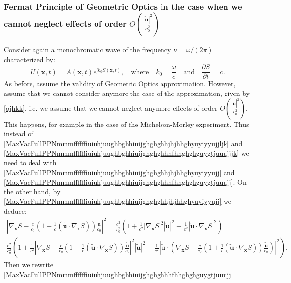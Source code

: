 \documentclass{article}
\theoremstyle{definition}
\theoremstyle{remark}
\renewcommand{\vec}[1]{\mathbf{#1}}
\newcommand{\er}{\eqref}
\newcommand{\er}{\eqref}
\begin{document}
\subsubsection{Fermat Principle of Geometric Optics in the case when we cannot neglect effects of order $O\left(\frac{|\vec {\tilde
u}|^2}{c^2_0}\right)$}
Consider again a monochromatic wave of the
frequency $\nu=\omega/(2\pi)$ characterized by:
\begin{equation}\label{MaxVacFullPPNmmmffffffiuiuhjuughbghhuiiujjhhjjhjhhjyuyhh}
U(\vec x,t)=A(\vec x,t)e^{ik_0S(\vec x,t)},\quad\text{where}\quad
k_0=\frac{\omega}{c}\quad\text{and}\quad\frac{\partial S}{\partial
t}=c\,.
\end{equation}
As before, assume the validity of Geometric Optics approximation.
However, assume that we cannot consider anymore the case of the
approximation, given by \er{ojhkk}, i.e. we assume that we cannot
neglect anymore effects of order $O\left(\frac{|\vec {\tilde
u}|^2}{c^2_0}\right)$. This happens, for example in the case of the
Michelson-Morley experiment. Thus instead of
\er{MaxVacFullPPNmmmffffffiuiuhjuughbghhiuijghghghhjhjhhghyuyiyyujjljk}
and
\er{MaxVacFullPPNmmmffffffiuiuhjuughbghhiuijghghghhhfhhghghguygtjuuujjjk}
we need to deal with
\er{MaxVacFullPPNmmmffffffiuiuhjuughbghhiuijghghghhjhjhhghyuyiyyujj}
 and
\er{MaxVacFullPPNmmmffffffiuiuhjuughbghhiuijghghghhhfhhghghguygtjuuujj}.
On the other hand, by
\er{MaxVacFullPPNmmmffffffiuiuhjuughbghhiuijghghghhjhjhhghyuyiyyujj}
we deduce:
\begin{multline}\label{MaxVacFullPPNmmmffffffiuiuhjuughbghhiuijghghghhjhjhhghyuyiyyujjkhgggghgg}
\left|\nabla_{\vec x}S-\frac{c}{c_0}\left(1+\frac{1}{c}\left(\vec
{\tilde u}\cdot\nabla_{\vec x}S\right)\right)\frac{\vec {\tilde
u}}{c_0}\right|^2=\frac{c^2}{c^2_0}\left(1+\frac{1}{c^2}\left|\nabla_\vec
x S\right|^2\left|\vec {\tilde u}\right|^2-\frac{1}{c^2}\left|\vec
{\tilde u}\cdot\nabla_\vec x S\right|^2\right)=\\
\frac{c^2}{c^2_0}\left(1+\frac{1}{c^2}\left|\nabla_{\vec
x}S-\frac{c}{c_0}\left(1+\frac{1}{c}\left(\vec {\tilde
u}\cdot\nabla_{\vec x}S\right)\right)\frac{\vec {\tilde
u}}{c_0}\right|^2\left|\vec {\tilde
u}\right|^2-\frac{1}{c^2}\left|\vec {\tilde
u}\cdot\left(\nabla_{\vec
x}S-\frac{c}{c_0}\left(1+\frac{1}{c}\left(\vec {\tilde
u}\cdot\nabla_{\vec x}S\right)\right)\frac{\vec {\tilde
u}}{c_0}\right)\right|^2\right).
\end{multline}
Then we rewrite
\er{MaxVacFullPPNmmmffffffiuiuhjuughbghhiuijghghghhhfhhghghguygtjuuujj}
\end{document}
